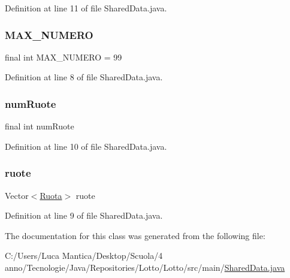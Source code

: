 Definition at line 11 of file Shared\+Data.\+java.

\mbox{\label{classmain_1_1_shared_data_af9e82eed5f04a857c2749dae6956ddc1}} 
\subsubsection{\texorpdfstring{M\+A\+X\+\_\+\+N\+U\+M\+E\+RO}{MAX\_NUMERO}}
{\footnotesize\ttfamily final int M\+A\+X\+\_\+\+N\+U\+M\+E\+RO = 99\hspace{0.3cm}{\ttfamily [static]}}



Definition at line 8 of file Shared\+Data.\+java.

\mbox{\label{classmain_1_1_shared_data_afd761d5f372b32a47d35514239540df6}} 
\subsubsection{\texorpdfstring{num\+Ruote}{numRuote}}
{\footnotesize\ttfamily final int num\+Ruote\hspace{0.3cm}{\ttfamily [private]}}



Definition at line 10 of file Shared\+Data.\+java.

\mbox{\label{classmain_1_1_shared_data_a3336af22f48845590e6b9cace9d82ce1}} 
\subsubsection{\texorpdfstring{ruote}{ruote}}
{\footnotesize\ttfamily Vector$<$\mbox{\hyperlink{classmain_1_1_ruota}{Ruota}}$>$ ruote\hspace{0.3cm}{\ttfamily [private]}}



Definition at line 9 of file Shared\+Data.\+java.



The documentation for this class was generated from the following file\+:\begin{DoxyCompactItemize}
\item 
C\+:/\+Users/\+Luca Mantica/\+Desktop/\+Scuola/4 anno/\+Tecnologie/\+Java/\+Repositories/\+Lotto/\+Lotto/src/main/\mbox{\hyperlink{_shared_data_8java}{Shared\+Data.\+java}}\end{DoxyCompactItemize}
